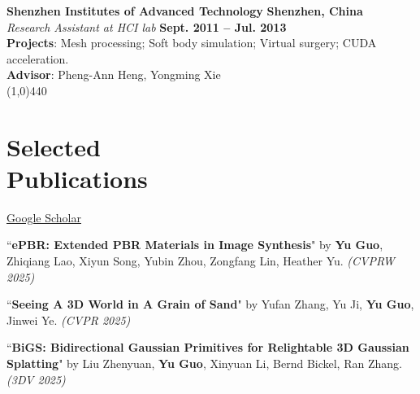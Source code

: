 \documentclass[margin,line]{resume}
\begin{document}
\begin{resume}
    \vspace{0.0mm}
    
    \textbf{Shenzhen Institutes of Advanced Technology}   \hfill \textbf{Shenzhen, China} \\
    \textsl{Research Assistant at HCI lab} \hfill \textbf{Sept. 2011 -- Jul. 2013} \\
    \textbf{Projects}: Mesh processing; Soft body simulation; Virtual surgery; CUDA acceleration. \\
    \textbf{Advisor}: Pheng-Ann Heng, Yongming Xie \\

	\vspace{-5.0mm}
	\line(1,0){440}
	\vspace{-5.0mm}
	
	\section{\mysidestyle Selected \\Publications}
	
	\href{https://scholar.google.com/citations?user=V2BnBGIAAAAJ&hl=en}{Google Scholar}

	``\textbf{ePBR: Extended PBR Materials in Image Synthesis}" 
	by \textbf{Yu Guo}, Zhiqiang Lao, Xiyun Song, Yubin Zhou, Zongfang Lin, Heather Yu.
	\textsl{(CVPRW 2025)}\\

	\vspace{-5mm}	

	``\textbf{Seeing A 3D World in A Grain of Sand}" 
	by Yufan Zhang, Yu Ji, \textbf{Yu Guo}, Jinwei Ye.
	\textsl{(CVPR 2025)}\\
	
	\vspace{-5mm}

	``\textbf{BiGS: Bidirectional Gaussian Primitives for Relightable 3D Gaussian Splatting}" 
	by Liu Zhenyuan, \textbf{Yu Guo}, Xinyuan Li, Bernd Bickel, Ran Zhang.
	\textsl{(3DV 2025)}\\
	
	\vspace{-5mm}

%	
	

\end{resume}
\end{document}
